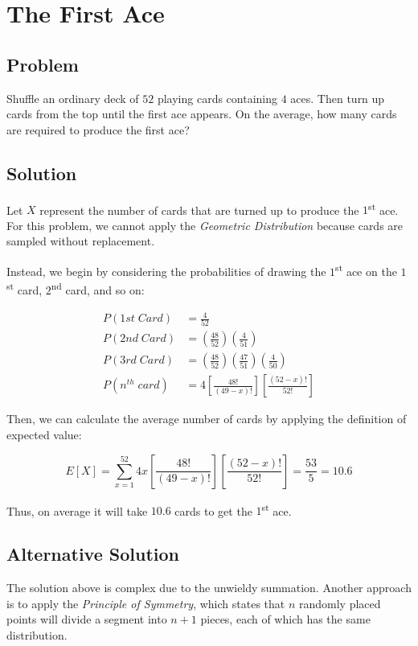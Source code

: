 \documentclass{article}
\date{}
\author{Kaan Aksoy | March 10, 2020}
\begin{document}
\maketitle
\section{The First Ace}
\subsection{Problem}
Shuffle an ordinary deck of $52$ playing cards containing $4$ 
aces. Then turn up cards from the top until the first ace 
appears. On the average, how many cards are required to produce 
the first ace?

\subsection{Solution}

Let $X$ represent the number of cards that are turned 
up to produce the $1$\textsuperscript{st} ace. For this 
problem, we cannot apply the \textit{Geometric Distribution}
because cards are sampled without replacement.

Instead, we begin by considering the 
probabilities of drawing the $1$\textsuperscript{st} ace 
on the $1$\textsuperscript{st} card, $2$\textsuperscript{nd} 
card, and so on:

\begin{equation*}
\begin{split}
P(1st\;Card) &= \frac{4}{52} \\
P(2nd\;Card) &= \left(\frac{48}{52}\right)\left(\frac{4}{51}\right) \\
P(3rd\;Card) &= \left(\frac{48}{52}\right)\left(\frac{47}{51}\right)
\left(\frac{4}{50}\right) \\
P(n^{th}\; card) &= 4\left[\frac{48!}{(49-x)!}\right]\left[{\frac{(52-x)!}{52!}} \right]
\end{split}
\end{equation*}

Then, we can calculate the average number of cards by applying the 
definition of expected value:

$$E[X] = \sum_{x=1}^{52} 
4x\left[\frac{48!}{(49-x)!}\right]\left[{\frac{(52-x)!}{52!}} \right]
= \frac{53}{5} = 10.6$$

Thus, on average it will take $10.6$ cards to get the 
$1$\textsuperscript{st} ace.

\subsection{Alternative Solution}
The solution above is complex due to the unwieldy summation. Another 
approach is to apply the \textit{Principle of Symmetry}, which states 
that $n$ randomly placed points will divide a segment into $n+1$ pieces, 
each of which has the same distribution.
\end{document}
